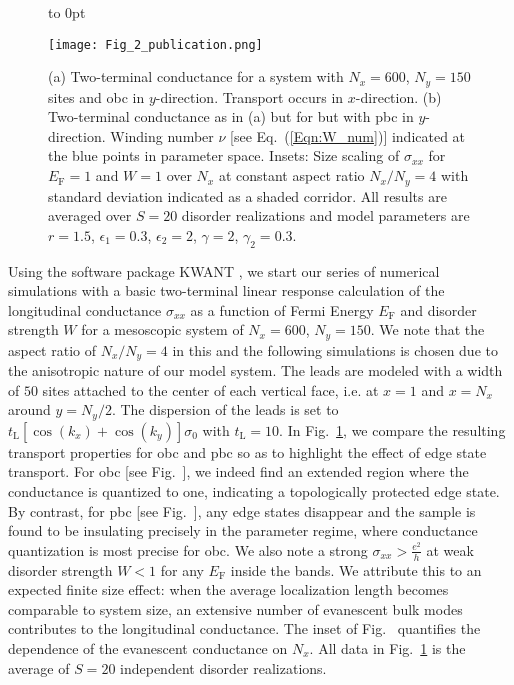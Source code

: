 \documentclass[aps,prl,amsmath,amssymb,twocolumn, superscriptaddress]{revtex4-2}
\newcommand{\eq}[1]{Eq.~(\ref{#1})}
\begin{document}
\begin{figure}[htp!]	 
{
    \vbox to 0pt {
            \raggedright
            \textcolor{white}{
            }
        }
}
{\texttt{[image: Fig\_2\_publication.png]}}
\caption{(a) Two-terminal conductance for a system with $N_x = 600$, $N_y = 150$ sites and \gls{obc} in $y$-direction. Transport occurs in $x$-direction. (b) Two-terminal conductance as in (a) but for but with \gls{pbc} in $y$-direction. Winding number $\nu$ [see \eq{Eqn:W_num}] indicated at the blue points in parameter space. Insets: Size scaling of $\sigma_{xx}$ for $E_\mathrm{F} = 1$ and $W = 1$ over $N_x$ at constant aspect ratio $N_x/N_y=4$ with standard deviation indicated as a shaded corridor. All results are averaged over $S = 20$ disorder realizations and model parameters are $r = 1.5$, $\epsilon_1 = 0.3$, $\epsilon_2 = 2$, $\gamma  =2$, $\gamma_2 = 0.3$.}\label{Fig:Transport}
\end{figure}

Using the software package KWANT \cite{Kwant, Kwant_Mumps, KPM_tools}, we start our series of numerical simulations with a basic two-terminal linear response calculation of the longitudinal conductance $\sigma_{xx}$ as a function of Fermi Energy $E_\mathrm{F}$ and disorder strength $W$ for a mesoscopic system of $N_x = 600$, $N_y = 150$. We note that the aspect ratio of $N_x/N_y=4$ in this and the following simulations is chosen due to the anisotropic nature of our model system. The leads are modeled with a width of $50$ sites attached to the center of each vertical face, i.e. at $x=1$ and $x=N_x$ around $y=N_y/2$. The dispersion of the leads is set to $t_\mathrm{L} [\cos(k_x)  + \cos(k_y)] \sigma_0$ with $t_\mathrm{L} = 10$. In Fig.~\ref{Fig:Transport}, we compare the resulting transport properties for \gls{obc} and \gls{pbc} so as to highlight the effect of edge state transport. For \gls{obc}  [see Fig.~], we indeed find an extended region where the conductance is quantized to one, indicating a topologically protected edge state. By contrast, for \gls{pbc} [see Fig.~], any edge states disappear and the sample is found to be insulating precisely in the parameter regime, where conductance quantization is most precise for \gls{obc}. We also note a strong $\sigma_{xx} > \frac{e^2}{h}$ at weak disorder strength $W<1$ for any $E_\mathrm{F}$ inside the bands. We attribute this to an expected finite size effect: when the average localization length becomes comparable to system size, an extensive number of evanescent bulk modes contributes to the longitudinal conductance. The inset of Fig.~ quantifies the dependence of the evanescent conductance on $N_x$. All data in Fig.~\ref{Fig:Transport} is the average of $S = 20$ independent disorder realizations.
\end{document}
